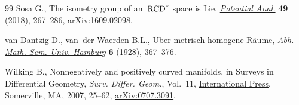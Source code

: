 \begin{thebibliography}{99}
Sosa G., The isometry group of an~{${\rm RCD}^*$} space is {L}ie,
 \href{https://doi.org/10.1007/s11118-017-9656-4}{\textit{Potential Anal.}}
 \textbf{49} (2018), 267--286,
 \href{http://arxiv.org/abs/1609.02098}{arXiv:1609.02098}.

van Dantzig D., van~der Waerden B.L., \"Uber metrisch homogene {R}\"aume,
 \href{https://doi.org/10.1007/BF02940622}{\textit{Abh. Math. Sem. Univ.
 Hamburg}} \textbf{6} (1928), 367--376.

Wilking B., Nonnegatively and positively curved manifolds, in Surveys in
 {D}ifferential {G}eometry, \textit{Surv. Differ. Geom.}, Vol.~11,
 \href{https://doi.org/10.4310/SDG.2006.v11.n1.a3}{International Press},
 Somerville, MA, 2007, 25--62,
 \href{http://arxiv.org/abs/0707.3091}{arXiv:0707.3091}.

\end{thebibliography}
